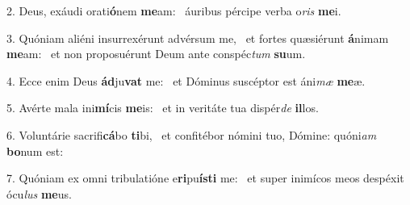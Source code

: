 2. Deus, exáudi orati\textbf{ó}nem \textbf{me}am: \ast\  áuribus pércipe verba o\textit{ris} \textbf{me}i.\

3. Quóniam aliéni insurrexérunt advérsum me, \dag\  et fortes quæsiérunt \textbf{á}nimam \textbf{me}am: \ast\  et non proposuérunt Deum ante conspéc\textit{tum} \textbf{su}um.\

4. Ecce enim Deus \textbf{ád}ju\textbf{vat} me: \ast\  et Dóminus suscéptor est áni\textit{mæ} \textbf{me}æ.\

5. Avérte mala ini\textbf{mí}cis \textbf{me}is: \ast\  et in veritáte tua dispér\textit{de} \textbf{il}los.\

6. Voluntárie sacrifi\textbf{cá}bo \textbf{ti}bi, \ast\  et confitébor nómini tuo, Dómine: quóni\textit{am} \textbf{bo}num est:\

7. Quóniam ex omni tribulatióne e\textbf{ri}pu\textbf{ís}\textbf{ti} me: \ast\  et super inimícos meos despéxit ócu\textit{lus} \textbf{me}us.\

